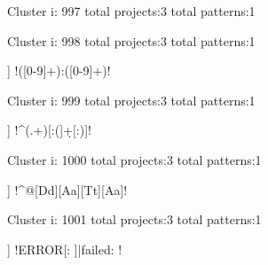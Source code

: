 Cluster i: 997
total projects:3
total patterns:1
\begin{multicols}{1}
\end{multicols}







Cluster i: 998
total projects:3
total patterns:1
\begin{multicols}{1}
\begin{description}[noitemsep,topsep=0pt]
\item [[3] ] \cverb!([0-9]+):([0-9]+)!
\end{description}
\end{multicols}







Cluster i: 999
total projects:3
total patterns:1
\begin{multicols}{1}
\begin{description}[noitemsep,topsep=0pt]
\item [[3] ] \cverb!^(.+)[:(]\d+[:)]!
\end{description}
\end{multicols}







Cluster i: 1000
total projects:3
total patterns:1
\begin{multicols}{1}
\begin{description}[noitemsep,topsep=0pt]
\item [[3] ] \cverb!^@[Dd][Aa][Tt][Aa]!
\end{description}
\end{multicols}







Cluster i: 1001
total projects:3
total patterns:1
\begin{multicols}{1}
\begin{description}[noitemsep,topsep=0pt]
\item [[3] ] \cverb!ERROR[: ]|failed: !
\end{description}
\end{multicols}







